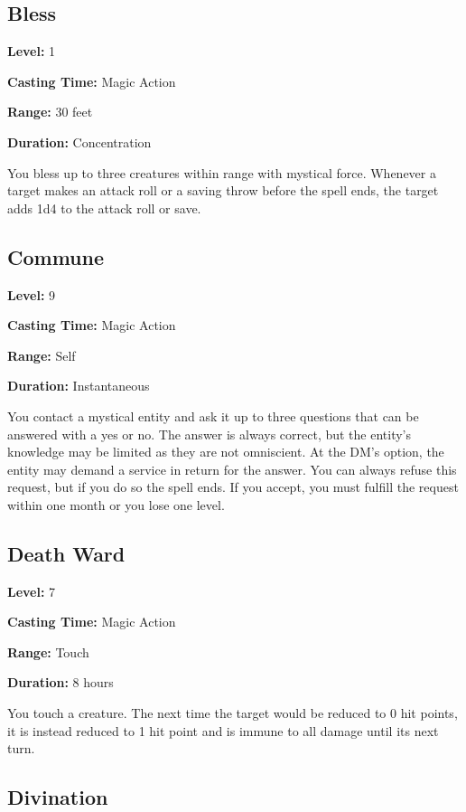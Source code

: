 \documentclass[12pt,letterpaper,twocolumn,openany,nodeprecatedcode,bg=none]{dndbook}
\begin{document}
\subsection{Bless}\label{bless}

\textbf{Level:} 1

\textbf{Casting Time:} Magic Action

\textbf{Range:} 30 feet

\textbf{Duration:} Concentration

You bless up to three creatures within range with mystical force.
Whenever a target makes an attack roll or a saving throw before the
spell ends, the target adds 1d4 to the attack roll or save.

\subsection{Commune}\label{commune}

\textbf{Level:} 9

\textbf{Casting Time:} Magic Action

\textbf{Range:} Self

\textbf{Duration:} Instantaneous

You contact a mystical entity and ask it up to three questions that can
be answered with a yes or no. The answer is always correct, but the
entity's knowledge may be limited as they are not omniscient. At the
DM's option, the entity may demand a service in return for the answer.
You can always refuse this request, but if you do so the spell ends. If
you accept, you must fulfill the request within one month or you lose
one level.

\subsection{Death Ward}\label{death-ward}

\textbf{Level:} 7

\textbf{Casting Time:} Magic Action

\textbf{Range:} Touch

\textbf{Duration:} 8 hours

You touch a creature. The next time the target would be reduced to 0 hit
points, it is instead reduced to 1 hit point and is immune to all damage
until its next turn.

\subsection{Divination}\label{divination}
\end{document}
